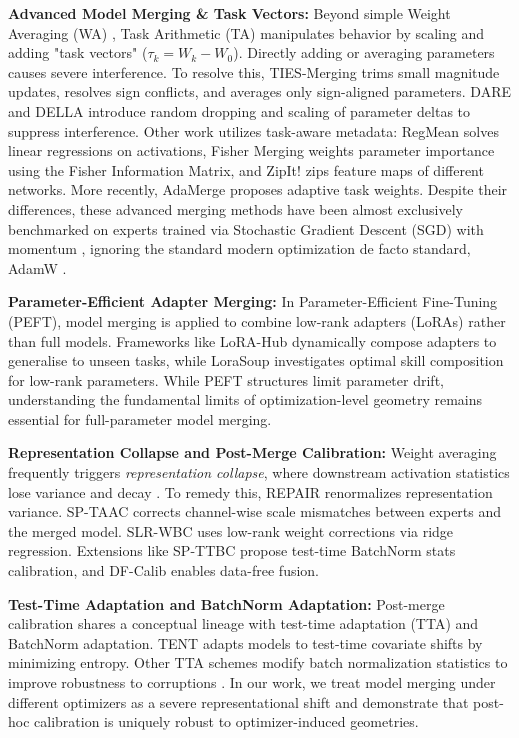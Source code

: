 \documentclass{article}
\theoremstyle{plain}
\theoremstyle{definition}
\theoremstyle{remark}
\begin{document}
\textbf{Advanced Model Merging \& Task Vectors:} Beyond simple Weight Averaging (WA) \cite{wortsman2022model}, Task Arithmetic (TA) \cite{ilharco2022editing} manipulates behavior by scaling and adding "task vectors" ($\tau_k = W_k - W_0$). Directly adding or averaging parameters causes severe interference. To resolve this, TIES-Merging \cite{yadav2023ties} trims small magnitude updates, resolves sign conflicts, and averages only sign-aligned parameters. DARE \cite{yu2023dare} and DELLA \cite{delle2024della} introduce random dropping and scaling of parameter deltas to suppress interference. Other work utilizes task-aware metadata: RegMean \cite{jin2022raw} solves linear regressions on activations, Fisher Merging \cite{matena2022merging} weights parameter importance using the Fisher Information Matrix, and ZipIt! \cite{stoica2023zip} zips feature maps of different networks. More recently, AdaMerge \cite{pan24adamerge} proposes adaptive task weights. Despite their differences, these advanced merging methods have been almost exclusively benchmarked on experts trained via Stochastic Gradient Descent (SGD) with momentum \cite{sutskever2013importance}, ignoring the standard modern optimization de facto standard, AdamW \cite{loshchilov2018decoupled}.

\textbf{Parameter-Efficient Adapter Merging:} In Parameter-Efficient Fine-Tuning (PEFT), model merging is applied to combine low-rank adapters (LoRAs) rather than full models. Frameworks like LoRA-Hub \cite{huang2024lorahub} dynamically compose adapters to generalise to unseen tasks, while LoraSoup \cite{ni2024lorasoup} investigates optimal skill composition for low-rank parameters. While PEFT structures limit parameter drift, understanding the fundamental limits of optimization-level geometry remains essential for full-parameter model merging.

\textbf{Representation Collapse and Post-Merge Calibration:} Weight averaging frequently triggers \textit{representation collapse}, where downstream activation statistics lose variance and decay \cite{qu2025vanishing}. To remedy this, REPAIR \cite{jordan2023repair} renormalizes representation variance. SP-TAAC \cite{sptaac2026} corrects channel-wise scale mismatches between experts and the merged model. SLR-WBC \cite{slrwbc2026} uses low-rank weight corrections via ridge regression. Extensions like SP-TTBC \cite{spttbc2026} propose test-time BatchNorm stats calibration, and DF-Calib \cite{dfcalib2026} enables data-free fusion. 

\textbf{Test-Time Adaptation and BatchNorm Adaptation:} Post-merge calibration shares a conceptual lineage with test-time adaptation (TTA) and BatchNorm adaptation. TENT \cite{wang2020tent} adapts models to test-time covariate shifts by minimizing entropy. Other TTA schemes \cite{liang2023comprehensive, boudiaf2022parameter} modify batch normalization statistics to improve robustness to corruptions \cite{schneider2020improving, nado2020evaluating, hendrycks2019benchmarking}. In our work, we treat model merging under different optimizers as a severe representational shift and demonstrate that post-hoc calibration is uniquely robust to optimizer-induced geometries.
\end{document}
